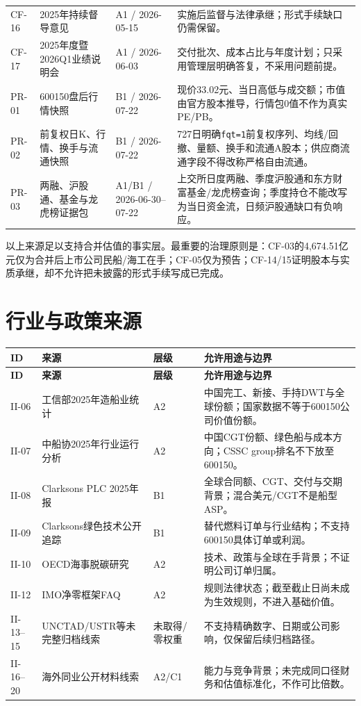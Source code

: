 \begin{longtable}{L{1.6cm} L{4.4cm} L{2.4cm} L{6.5cm}}
CF-16 & 2025年持续督导意见 & A1 / 2026-05-15 & 实施后监督与法律承继；形式手续缺口仍需保留。 \\
CF-17 & 2025年度暨2026Q1业绩说明会 & A1 / 2026-06-03 & 交付批次、成本占比与年度计划；只采用管理层明确答复，不采用问题前提。 \\
PR-01 & 600150盘后行情快照 & B1 / 2026-07-22 & 现价33.02元、当日高低与成交额；市值由官方股本推导，行情包0值不作为真实PE/PB。 \\
PR-02 & 前复权日K、行情、换手与流通快照 & B1 / 2026-07-22 & 727日明确\texttt{fqt=1}前复权序列、均线/回撤、量额、换手和流通A股本；供应商流通字段不得改称严格自由流通。 \\
PR-03 & 两融、沪股通、基金与龙虎榜证据包 & A1/B1 / 2026-06-30--07-22 & 上交所日度两融、季度沪股通和东方财富基金/龙虎榜查询；季度持仓不能改写为当日资金流，日频沪股通缺口有负响应。 \\
\bottomrule
\end{longtable}
\normalsize

以上来源足以支持合并估值的事实层。最重要的治理原则是：CF-03的4,674.51亿元仅为合并后上市公司民船/海工在手；CF-05仅为预告；CF-14/15证明股本与实质承继，却不允许把未披露的形式手续写成已完成。

\section{行业与政策来源}

\small
\begin{longtable}{L{1.6cm} L{4.4cm} L{2.4cm} L{6.5cm}}
\toprule
\textbf{ID} & \textbf{来源} & \textbf{层级} & \textbf{允许用途与边界} \\
\midrule
\endfirsthead
\toprule
\textbf{ID} & \textbf{来源} & \textbf{层级} & \textbf{允许用途与边界} \\
\midrule
\endhead
II-06 & 工信部2025年造船业统计 & A2 & 中国完工、新接、手持DWT与全球份额；国家数据不等于600150公司价值份额。 \\
II-07 & 中船协2025年行业运行分析 & A2 & 中国CGT份额、绿色船与成本方向；CSSC group排名不下放至600150。 \\
II-08 & Clarksons PLC 2025年报 & B1 & 全球合同额、CGT、交付与交期背景；混合美元/CGT不是船型ASP。 \\
II-09 & Clarksons绿色技术公开追踪 & B1 & 替代燃料订单与行业结构；不支持600150具体订单或利润。 \\
II-10 & OECD海事脱碳研究 & A2 & 技术、政策与全球在手背景；不证明公司订单归属。 \\
II-12 & IMO净零框架FAQ & A2 & 规则法律状态；截至截止日尚未成为生效规则，不进入基础价值。 \\
II-13--15 & UNCTAD/USTR等未完整归档线索 & 未取得/零权重 & 不支持精确数字、日期或公司影响，仅保留后续归档路径。 \\
II-16--20 & 海外同业公开材料线索 & A2/C1 & 能力与竞争背景；未完成同口径财务和估值标准化，不作可比倍数。 \\
\bottomrule
\end{longtable}
\normalsize

